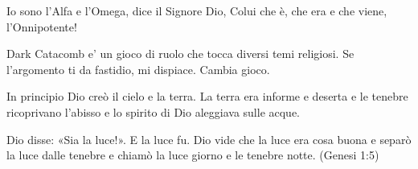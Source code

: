 \documentclass[12pt,a4paper,twoside,openany]{book}
\begin{document}

\pagebreak

{\LARGE \begin{center}
		Io sono l'Alfa e l'Omega, dice il Signore Dio, Colui che è, che era e che viene, l'Onnipotente!
\end{center}}

\vspace{15cm}

Dark Catacomb e' un gioco di ruolo che tocca diversi temi religiosi. Se l'argomento ti da fastidio, mi dispiace. Cambia gioco.

\pagebreak

\setcounter{page}{1}

\begin{multicols}{2}
\tableofcontents{}

\end{multicols}

\vfill

\begin{changemargin}{0.3cm}{0.3cm}\begin{tcolorbox}
In principio Dio creò il cielo e la terra. La terra era informe e deserta e le tenebre ricoprivano l'abisso e lo spirito di Dio aleggiava sulle acque.

Dio disse: «Sia la luce!». E la luce fu. Dio vide che la luce era cosa buona e separò la luce dalle tenebre e chiamò la luce giorno e le tenebre notte. (Genesi 1:5)
\end{tcolorbox}\end{changemargin}

\pagebreak





\end{document}
